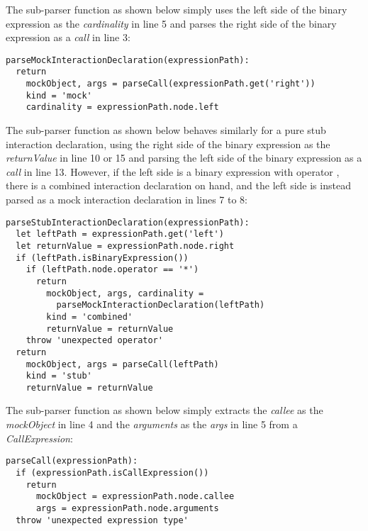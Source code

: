 The sub-parser function  as shown below simply
uses the left side of the binary expression as the \textit{cardinality}
in line 5
and parses the right side of the binary expression as a \textit{call}
in line 3:
\begin{verbatim}
parseMockInteractionDeclaration(expressionPath):
  return
    mockObject, args = parseCall(expressionPath.get('right'))
    kind = 'mock'
    cardinality = expressionPath.node.left
\end{verbatim}

The sub-parser function  as shown below
behaves similarly for a pure stub interaction declaration,
using the right side of the binary expression as the \textit{returnValue} in line 10 or 15
and parsing the left side of the binary expression as a \textit{call} in line 13.
However, if the left side is a binary expression with operator ,
there is a combined interaction declaration on hand,
and the left side is instead parsed as a mock interaction declaration in lines 7 to 8:
\begin{verbatim}
parseStubInteractionDeclaration(expressionPath):
  let leftPath = expressionPath.get('left')
  let returnValue = expressionPath.node.right
  if (leftPath.isBinaryExpression())
    if (leftPath.node.operator == '*')
      return
        mockObject, args, cardinality =
          parseMockInteractionDeclaration(leftPath)
        kind = 'combined'
        returnValue = returnValue
    throw 'unexpected operator'
  return
    mockObject, args = parseCall(leftPath)
    kind = 'stub'
    returnValue = returnValue
\end{verbatim}

The sub-parser function  as shown below
simply extracts the \textit{callee} as the \textit{mockObject} in line 4
and the \textit{arguments} as the \textit{args} in line 5
from a \textit{CallExpression}:
\begin{verbatim}
parseCall(expressionPath):
  if (expressionPath.isCallExpression())
    return
      mockObject = expressionPath.node.callee
      args = expressionPath.node.arguments
  throw 'unexpected expression type'
\end{verbatim}
